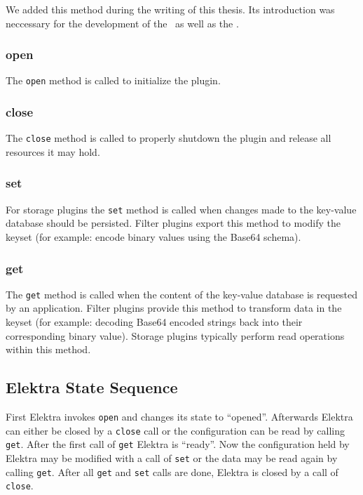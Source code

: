 We added this method during the writing of this thesis.
Its introduction was neccessary for the development of the \crypto ~as well as the \fcrypt.

\subsubsection{open}\label{open}

The \texttt{open} method is called to initialize the plugin.

\subsubsection{close}\label{close}

The \texttt{close} method is called to properly shutdown the plugin and
release all resources it may hold.

\subsubsection{set}\label{set}

For storage plugins the \texttt{set} method is called when changes made to the key-value
database should be persisted.
Filter plugins export this method to modify the keyset (for example: encode binary values using the Base64 schema).

\subsubsection{get}\label{get}

The \texttt{get} method is called when the content of the key-value
database is requested by an application.
Filter plugins provide this method to transform data in the keyset (for example: decoding Base64 encoded strings back into their corresponding binary value).
Storage plugins typically perform read operations within this method.

\subsection{Elektra State Sequence}

First Elektra invokes \texttt{open} and changes its state to ``opened''.
Afterwards Elektra can either be closed by a \texttt{close} call or the configuration can be read by calling \texttt{get}.
After the first call of \texttt{get} Elektra is ``ready''.
Now the configuration held by Elektra may be modified with a call of \texttt{set} or the data may be read again by calling \texttt{get}.
After all \texttt{get} and \texttt{set} calls are done, Elektra is closed by a call of \texttt{close}.\cite{elektra-doc}

